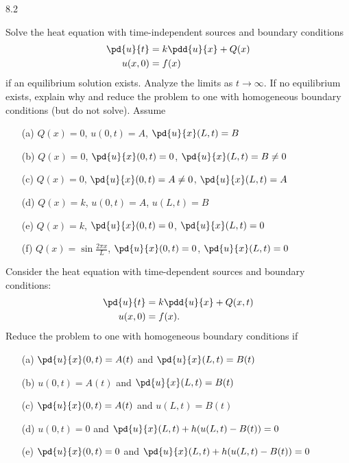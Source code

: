 \begin{exercises}{8.2}

\item Solve the heat equation with time-independent sources and boundary conditions
\begin{align*}
\pd{u}{t} &= k\pdd{u}{x} + Q(x) \\
u(x,0) &= f(x)
\end{align*}
if an equilibrium solution exists.  Analyze the limits as $t\to\infty$.  If no equilibrium exists, explain why and reduce the problem to one with homogeneous boundary conditions (but do not solve).  Assume
\begin{enumerate}
\item[\starred(a)] $Q(x) = 0$, \quad $u(0,t) = A$, \quad $\pd{u}{x}(L,t) = B$
\item[(b)] $Q(x) = 0$, \quad $\pd{u}{x}(0,t) = 0$, \quad $\pd{u}{x}(L,t) = B \neq 0$
\item[(c)] $Q(x) = 0$, \quad $\pd{u}{x}(0,t) = A \neq 0$, \quad $\pd{u}{x}(L,t) = A$
\item[\starred(d)] $Q(x) = k$, \quad $u(0,t) = A$, \quad $u(L,t) = B$
\item[(e)] $Q(x) = k$, \quad $\pd{u}{x}(0,t) = 0$, \quad $\pd{u}{x}(L,t) = 0$
\item[(f)] $Q(x) = \sin\frac{2\pi x}{L}$, \quad $\pd{u}{x}(0,t) = 0$, \quad $\pd{u}{x}(L,t) = 0$
\end{enumerate}

\item Consider the heat equation with time-dependent sources and boundary conditions:
\begin{align*}
\pd{u}{t} &= k\pdd{u}{x} + Q(x,t) \\
u(x,0) &= f(x).
\end{align*}
Reduce the problem to one with homogeneous boundary conditions if
\begin{enumerate}
\item[\starred(a)] $\pd{u}{x}(0,t) = A(t)$ \quad and \quad $\pd{u}{x}(L,t) = B(t)$
\item[(b)] $u(0,t) = A(t)$ \quad and \quad $\pd{u}{x}(L,t) = B(t)$
\item[\starred(c)] $\pd{u}{x}(0,t) = A(t)$ \quad and \quad $u(L,t) = B(t)$
\item[(d)] $u(0,t) = 0$ \quad and \quad $\pd{u}{x}(L,t) + h(u(L,t) - B(t)) = 0$
\item[(e)] $\pd{u}{x}(0,t) = 0$ \quad and \quad $\pd{u}{x}(L,t) + h(u(L,t) - B(t)) = 0$
\end{enumerate}


\end{exercises}
